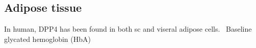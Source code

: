 \subsection{Adipose tissue}
In human, DPP4 has been found in both sc and viseral adipose cells.~\cite{Lamers2011} Baseline glycated hemoglobin (HbA) 
